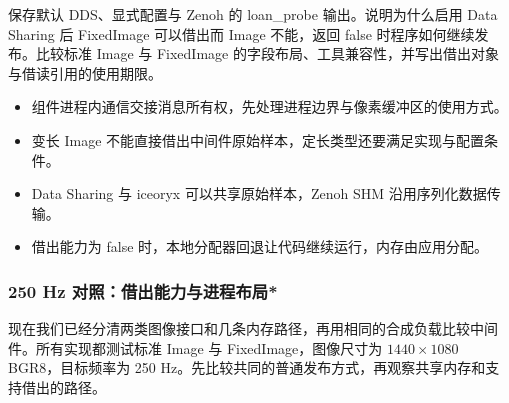 \begin{exercise}
\label{ex:v2-ros-loans}
保存默认 DDS、显式配置与 Zenoh 的 loan\_probe 输出。说明为什么启用 Data Sharing 后 FixedImage 可以借出而 Image 不能，返回 false 时程序如何继续发布。比较标准 Image 与 FixedImage 的字段布局、工具兼容性，并写出借出对象与借读引用的使用期限。
\end{exercise}

\begin{conclusion}
\begin{itemize}
\item 组件进程内通信交接消息所有权，先处理进程边界与像素缓冲区的使用方式。
\item 变长 Image 不能直接借出中间件原始样本，定长类型还要满足实现与配置条件。
\item Data Sharing 与 iceoryx 可以共享原始样本，Zenoh SHM 沿用序列化数据传输。
\item 借出能力为 false 时，本地分配器回退让代码继续运行，内存由应用分配。
\end{itemize}
\end{conclusion}

\subsubsection{250 Hz 对照：借出能力与进程布局*}
\label{sec:ros2-image-measurement}
现在我们已经分清两类图像接口和几条内存路径，再用相同的合成负载比较中间件。所有实现都测试标准 Image 与 FixedImage，图像尺寸为 $1440\times1080$ BGR8，目标频率为 250 Hz。先比较共同的普通发布方式，再观察共享内存和支持借出的路径。


